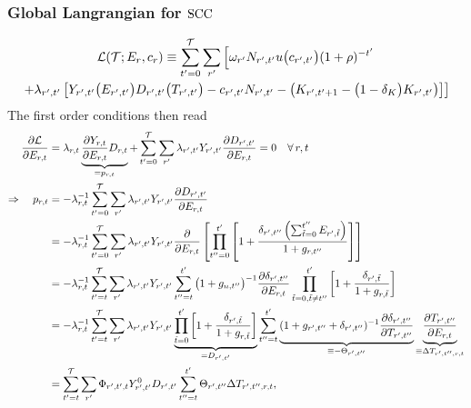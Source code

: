 \documentclass[preprint,3p,authoryear]{elsarticle}
\begin{document}
\subsubsection{Global Langrangian for $\operatorname{SCC}$}
\label{sec:Lglob}
\begin{multline}
  \label{eq:Lglob} \mathcal{L}(\mathcal{T};E_r,c_r)\equiv\sum_{t'=0}^{\mathcal{T}}\sum_{r'}\left[\omega_{r'}N_{r',t'}u\big(c_{r',t'}\big)(1+\rho)^{-t'}\right.\\
  \left.+\lambda_{r',t'}\left[Y_{r',t'}\big(E_{r',t'}\big)D_{r',t'}\big(T_{r',t'}\big) -c_{r',t'}N_{r',t'}-\left(K_{r',t'+1}-\big(1-\delta_K\big)K_{r',t'}\right) \right]\right]
\end{multline}
The first order conditions then read
\begin{align}
  \label{eq:partE}
  \frac{\partial\mathcal{L}}{\partial E_{r,t}} &= \lambda_{r,t}\underbrace{\frac{\partial Y_{r,t}}{\partial E_{r,t}}D_{r,t}}_{=p_{r,t}}+\sum_{t'=0}^{\mathcal{T}}\sum_{r'}\lambda_{r',t'}Y_{r',t'}\frac{\partial D_{r',t'}}{\partial E_{r,t}}=0\quad\forall\,r,t\notag\\
  \Rightarrow \quad p_{r,t} &= -\lambda_{r,t}^{-1}\sum_{t'=0}^{\mathcal{T}}\sum_{r'}\lambda_{r',t'}Y_{r',t'}\frac{\partial D_{r',t'}}{\partial E_{r,t}}\notag\\
                                              &= -\lambda_{r,t}^{-1}\sum_{t'=0}^{\mathcal{T}}\sum_{r'}\lambda_{r',t'}Y_{r',t'}\frac{\partial }{\partial E_{r,t}}\left[\prod_{t''=0}^{t'}\left[1+\frac{\delta_{r',t''}\left(\sum_{\tilde{t}=0}^{t''}E_{r',\tilde{t}}\right)}{1+g_{r,t''}} \right] \right]\notag\\
                                         &=-\lambda_{r,t}^{-1}\sum_{t'=t}^{\mathcal{T}}\sum_{r'}\lambda_{r',t'}Y_{r',t'} \sum_{t''=t}^{t'}\big(1+g_{n,t''}\big)^{-1}\frac{\partial\delta_{r',t''}}{\partial E_{r,t}}\prod_{\tilde{t}=0,\tilde{t}\neq t''}^{t'}\left[1+\frac{\delta_{r',\tilde{t}}}{1+g_{r,\tilde{t}}} \right]\notag\\
                                         &=-\lambda_{r,t}^{-1}\sum_{t'=t}^{\mathcal{T}}\sum_{r'}\lambda_{r',t'}Y_{r',t'}\underbrace{\prod_{\tilde{t}=0}^{t'}\left[1+\frac{\delta_{r',\tilde{t}}}{1+g_{r,\tilde{t}}}\right]}_{=D_{r',t'}}\sum_{t''=t}^{t'}\underbrace{(1+g_{r',t''}+\delta_{r',t''})^{-1}\frac{\partial\delta_{r',t''}}{\partial T_{r',t''}}}_{\equiv -\Theta_{r',t''}}\underbrace{\frac{\partial T_{r',t''}}{\partial E_{r,t}}}_{\equiv\Delta T_{r',t'',r,t}}\notag\\
&= \sum_{t'=t}^{\mathcal{T}}\sum_{r'}\Phi_{r',t',t}Y^0_{r',t'}D_{r',t'}\sum_{t''=t}^{t'}\Theta_{r',t''}\Delta T_{r',t'',r,t},  
\end{align}
\end{document}
